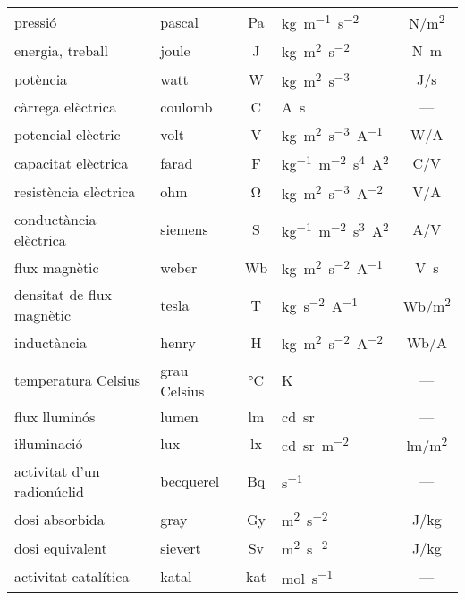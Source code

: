 \begin{ThreePartTable}
\begin{longtable}[h]{llclc}
   pressió & pascal & Pa  & \si{kg.m^{-1}.s^{-2}} & \si{N/m^2} \\
   energia, treball & joule & J & \si{kg.m^2.s^{-2}} & \si{N.m}\\
   potència & watt & W & \si{kg.m^2.s^{-3}}  & \si{J/s}\\
   càrrega elèctrica & coulomb & C  & \si{A.s} &  ---\\
   potencial elèctric & volt & V & \si{kg.m^2.s^{-3}.A^{-1}}  & \si{W/A}\\
   capacitat elèctrica & farad & F   & \si{kg^{-1}.m^{-2}.s^4.A^2}& \si{C/V}\\
   resistència elèctrica & ohm &  \si{\ohm}  & \si{kg.m^2.s^{-3}.A^{-2}} & \si{V/A}\\
   conductància elèctrica & siemens &  S  & \si{kg^{-1}.m^{-2}.s^3.A^2} & \si{A/V}\\
   flux magnètic & weber &  Wb  & \si{kg.m^2.s^{-2}.A^{-1}} & \si{V.s}\\
   densitat de flux magnètic & tesla &  T  & \si{kg.s^{-2}.A^{-1}} & \si{Wb/m^2}\\
   inductància & henry &  H  & \si{kg.m^2.s^{-2}.A^{-2}} & \si{Wb/A}\\
   temperatura Celsius & grau Celsius &  \si{\degreeCelsius} & \si{K} & --- \\
   flux lluminós & lumen & lm  & \si{cd.sr}& ---\\
   iŀluminació & lux & lx & \si{cd.sr.m^{-2}} & \si{lm/m^2} \\
   activitat  d'un radionúclid & becquerel & Bq& \si{s^{-1}} & --- \\
   dosi absorbida & gray & Gy  & \si{m^2.s^{-2}}& \si{J/kg}\\
   dosi equivalent & sievert & Sv  & \si{m^2.s^{-2}}& \si{J/kg}\\
   activitat catalítica & katal & kat & \si{mol.s^{-1}} & ---\\
   \bottomrule[1pt]
\end{longtable}
\end{ThreePartTable}
       
   
    
   
   
   
   
    
 
   
  
   
     
\index{\si{\ohm}}    
\index{\si{\degreeCelsius}}    

